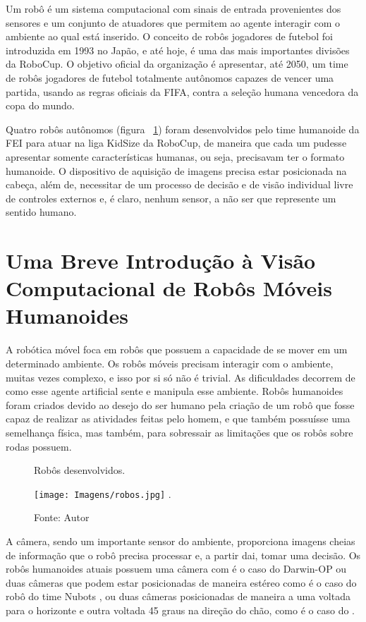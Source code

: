
\addtocounter{page}{-2} %

Um robô é um sistema computacional com sinais de entrada provenientes dos sensores e um conjunto de atuadores que permitem ao agente interagir com o ambiente ao qual está inserido. O conceito de robôs jogadores de futebol foi introduzida em 1993 no Japão, e até hoje, é uma das mais importantes divisões da RoboCup. O objetivo oficial da organização é apresentar, até 2050, um time de robôs jogadores de futebol totalmente autônomos capazes de vencer uma partida, usando as regras oficiais da FIFA, contra a seleção humana vencedora da copa do mundo. 

Quatro robôs autônomos (figura ~\ref{Fig:Robos}) foram desenvolvidos pelo time humanoide da FEI para atuar na liga KidSize da RoboCup, de maneira que cada um pudesse apresentar somente características humanas, ou seja, precisavam ter o formato humanoide. O dispositivo de aquisição de imagens precisa estar posicionada na cabeça, além de, necessitar de um processo de decisão e de visão individual livre de controles externos e, é claro, nenhum sensor, a não ser que represente um sentido humano. 


\section{Uma Breve Introdução à Visão Computacional de Robôs Móveis Humanoides}
\label{Intro}
A robótica móvel foca em robôs que possuem a capacidade de se mover em um determinado ambiente. Os robôs móveis precisam interagir com o ambiente, muitas vezes complexo, e isso por si só não é trivial. As dificuldades decorrem de como esse agente artificial sente e manipula esse ambiente.  Robôs humanoides foram criados devido ao desejo do ser humano pela criação de um robô que fosse capaz de realizar as atividades feitas pelo homem, e que também possuísse uma semelhança física, mas também, para sobressair as limitações que os robôs sobre rodas possuem.

\begin{figure}[!t]
\centering \caption{Robôs desenvolvidos.}
\texttt{[image: Imagens/robos.jpg]}
\DeclareGraphicsExtensions.
\caption*{Fonte: Autor}
\label{Fig:Robos}
\end{figure}

A câmera, sendo um importante sensor do ambiente, proporciona imagens cheias de informação que o robô precisa processar e, a partir dai, tomar uma decisão. Os robôs humanoides atuais possuem uma câmera com é o caso do Darwin-OP \cite{Darwin} ou duas câmeras que podem estar posicionadas de maneira estéreo como é o caso do robô do time Nubots \cite{Nubots} \cite{Edrom}, ou duas câmeras posicionadas de maneira a uma voltada para o horizonte e outra voltada 45 graus na direção do chão, como é o caso do . 




